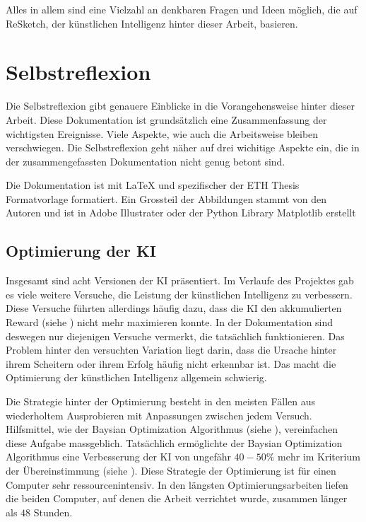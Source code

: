 Alles in allem sind eine Vielzahl an denkbaren Fragen und Ideen möglich, die auf
ReSketch, der künstlichen Intelligenz hinter dieser Arbeit, basieren.


\section{Selbstreflexion}\label{chap:d_reflex} Die Selbstreflexion gibt genauere
Einblicke in die Vorangehensweise hinter dieser Arbeit. Diese Dokumentation ist
grundsätzlich eine Zusammenfassung der wichtigsten Ereignisse. Viele Aspekte,
wie auch die Arbeitsweise bleiben verschwiegen. Die Selbstreflexion geht näher
auf drei wichitige Aspekte ein, die in der zusammengefassten Dokumentation nicht
genug betont sind.

Die Dokumentation ist mit LaTeX und spezifischer der ETH Thesis Formatvorlage
\cite{noauthor_cadmo_2014} formatiert. Ein Grossteil der Abbildungen stammt von den Autoren
und ist in Adobe Illustrater oder der Python Library Matplotlib erstellt

\subsection{Optimierung der KI}\label{sub:d_reflex_opti} Insgesamt sind acht
Versionen der KI präsentiert. Im Verlaufe des Projektes gab es viele weitere
Versuche, die Leistung der künstlichen Intelligenz zu verbessern. Diese Versuche
führten allerdings häufig dazu, dass die KI den akkumulierten Reward (siehe
) nicht mehr maximieren konnte. In der Dokumentation sind
deswegen nur diejenigen Versuche vermerkt, die tatsächlich funktionieren. Das
Problem hinter den versuchten Variation liegt darin, dass die Ursache hinter
ihrem Scheitern oder ihrem Erfolg häufig nicht erkennbar ist. Das macht die
Optimierung der künstlichen Intelligenz allgemein schwierig. 

Die Strategie hinter der Optimierung besteht in den meisten Fällen aus
wiederholtem Ausprobieren mit Anpassungen zwischen jedem Versuch. Hilfsmittel,
wie der Baysian Optimization Algorithmus (siehe ),
vereinfachen diese Aufgabe massgeblich. Tatsächlich ermöglichte der Baysian
Optimization Algorithmus eine Verbesserung der KI von ungefähr $40-50\%$ mehr im
Kriterium der Übereinstimmung (siehe ). Diese Strategie
der Optimierung ist für einen Computer sehr ressourcenintensiv. In den längsten
Optimierungsarbeiten liefen die beiden Computer, auf denen die Arbeit verrichtet
wurde, zusammen länger als $48$ Stunden.

